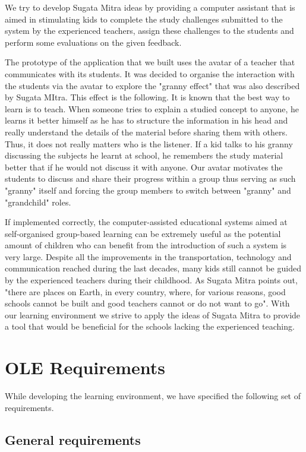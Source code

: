 \documentclass[a4paper]{article}
\begin{document}
We try to develop Sugata Mitra ideas by providing a computer assistant that is aimed in stimulating kids to complete the study challenges submitted to the system by the experienced teachers, assign these challenges to the students and perform some evaluations on the given feedback.

The prototype of the application that we built uses the avatar of a teacher that communicates with its students. It was decided to organise the interaction with the students via the avatar to explore the "granny effect" that was also described by Sugata MItra. This effect is the following. It is known that the best way to learn is to teach. When someone tries to explain a studied concept to anyone, he learns it better himself as he has to structure the information in his head and really understand the details of the material before sharing them with others. Thus, it does not really matters who is the listener. If a kid talks to his granny discussing the subjects he learnt at school, he remembers the study material better that if he would not discuss it with anyone. Our avatar motivates the students to discuss and share their progress within a group thus serving as such "granny" itself and forcing the group members to switch between "granny" and "grandchild" roles.

If implemented correctly, the computer-assisted educational systems aimed at self-organised group-based learning can be extremely useful as the potential amount of children who can benefit from the introduction of such a system is very large. Despite all the improvements in the transportation, technology and communication reached during the last decades, many kids still cannot be guided by the experienced teachers during their childhood. As Sugata Mitra points out, "there are places on Earth, in every country, where, for various reasons, good schools cannot be built and good teachers cannot or do not want to go". With our learning environment we strive to apply the ideas of Sugata Mitra to provide a tool that would be beneficial for the schools lacking the experienced teaching.


\section{OLE Requirements}

While developing the learning environment, we have specified the following set of requirements.

\subsection{General requirements}
\end{document}
